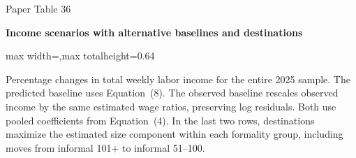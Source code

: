 \begin{frame}{Paper Table 36}
\begin{minipage}{\textwidth}\small\textbf{Income scenarios with alternative baselines and destinations}\end{minipage}\par\vspace{0.15cm}
\centering\begingroup\fontsize{8.5}{10}\selectfont
\setlength{\tabcolsep}{4pt}\renewcommand{\arraystretch}{1.06}
\begin{adjustbox}{max width=\textwidth,max totalheight=0.64\textheight}

\end{adjustbox}\endgroup\par\vspace{0.10cm}
{\fontsize{6.5}{7.5}\selectfont\raggedright Percentage changes in total weekly labor income for the entire 2025 sample. The predicted baseline uses Equation~(8). The observed baseline rescales observed income by the same estimated wage ratios, preserving log residuals. Both use pooled coefficients from Equation~(4). In the last two rows, destinations maximize the estimated size component within each formality group, including moves from informal 101+ to informal 51--100.\par}
\end{frame}

